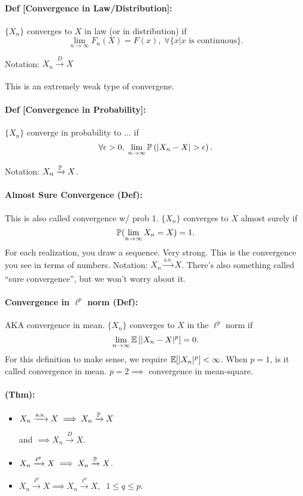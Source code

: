\paragraph*{Def [Convergence in Law/Distribution]: } $\{X_n\}$ converges to $X$ in law (or in distribution) if 
\[ \lim\limits_{n\to\infty} F_n(X) = F(x), \; \forall \{ x | \text{$x$ is continuous} \}. \]

Notation: $X_n \xrightarrow[]{D} X$ 

This is an extremely weak type of convergene. 

\paragraph*{Def [Convergence in Probability]: } 
$\{X_n\}$ converge in probability to ... if 
\[ \forall \epsilon > 0, \; \lim\limits_{n\to\infty} \mathbb{P}\left( |X_n - X| >\epsilon \right).  \]

Notation: $X_n \xrightarrow[]{\mathbb{P}} X$. 

\paragraph*{Almost Sure Convergence (Def): } This is also called convergence w/ prob 1. $\{X_n\}$ converges to $X$ almost surely if 
\[ \mathbb{P} (\lim\limits_{n\to\infty} X_n = X) = 1 .\]
For each realization, you draw a sequence. Very strong. This is the convergence you see in terms of numbers. Notation: $X_n \xrightarrow[]{\text{a.s.}} X$. There's also something called ``sure convergence'', but we won't worry about it. 

\paragraph*{Convergence in $\ell^p$ norm (Def): } AKA convergence in mean. $\{ X_n \}$ converges to $X$ in the $\ell^p$ norm if 
\[ 
	\lim\limits_{n\to\infty} \mathbb{E}\left[ |X_n - X|^p \right] = 0.	
\]
For this definition to make sense, we require $\mathbb{E}[|X_n|^p] < \infty$. When $p=1$, is it called convergence in mean. $p=2 \implies$ convergence in mean-square. 

\paragraph*{ (Thm): } 
\begin{itemize}
	\item $X_n \xrightarrow[]{\text{a.s.}} X \implies X_n \xrightarrow[]{\mathbb{P}} X$

	and $\implies X_n \xrightarrow[]{D} X$. 
	\item $X_n \xrightarrow[]{\ell^p} X \implies X_n \xrightarrow[]{\mathbb{P}} X$. 
	\item $X_n \xrightarrow[]{\ell^p} X \implies X_n \xrightarrow[]{\ell^q} X, \;\; 1 \leq q \leq p$. 
\end{itemize}


